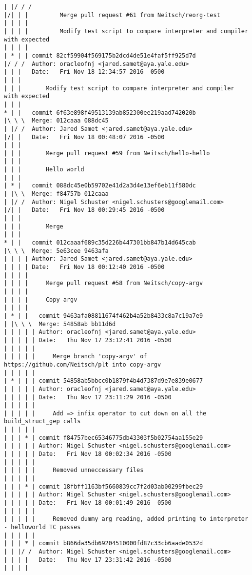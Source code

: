 \begin{lstlisting}
| |/ / /    
|/| | |         Merge pull request #61 from Neitsch/reorg-test
| | | |         
| | | |         Modify test script to compare interpreter and compiler with expected
| | | |     
| * | | commit 82cf59904f569175b2dcd4de51e4faf5ff925d7d
|/ / /  Author: oracleofnj <jared.samet@aya.yale.edu>
| | |   Date:   Fri Nov 18 12:34:57 2016 -0500
| | |   
| | |       Modify test script to compare interpreter and compiler with expected
| | |      
* | |   commit 6f63e898f49513139ab852300ee219aad742020b
|\ \ \  Merge: 012caaa 088dc45
| |/ /  Author: Jared Samet <jared.samet@aya.yale.edu>
|/| |   Date:   Fri Nov 18 00:48:07 2016 -0500
| | |   
| | |       Merge pull request #59 from Neitsch/hello-hello
| | |       
| | |       Hello world
| | |      
| * |   commit 088dc45e0b59702e41d2a3d4e13ef6eb11f580dc
| |\ \  Merge: f84757b 012caaa
| |/ /  Author: Nigel Schuster <nigel.schusters@googlemail.com>
|/| |   Date:   Fri Nov 18 00:29:45 2016 -0500
| | |   
| | |       Merge
| | |      
* | |   commit 012caaaf689c35d226b447301bb847b14d645cab
|\ \ \  Merge: 5e63cee 9463afa
| | | | Author: Jared Samet <jared.samet@aya.yale.edu>
| | | | Date:   Fri Nov 18 00:12:40 2016 -0500
| | | | 
| | | |     Merge pull request #58 from Neitsch/copy-argv
| | | |     
| | | |     Copy argv
| | | |       
| * | |   commit 9463afa08811674f462b4a52b8433c8a7c19a7e9
| |\ \ \  Merge: 54858ab bb11d6d
| | | | | Author: oracleofnj <jared.samet@aya.yale.edu>
| | | | | Date:   Thu Nov 17 23:12:41 2016 -0500
| | | | | 
| | | | |     Merge branch 'copy-argv' of https://github.com/Neitsch/plt into copy-argv
| | | | |      
| * | | | commit 54858ab5bbcc0b1879f4b4d7387d9e7e839e0677
| | | | | Author: oracleofnj <jared.samet@aya.yale.edu>
| | | | | Date:   Thu Nov 17 23:11:29 2016 -0500
| | | | | 
| | | | |     Add => infix operator to cut down on all the build_struct_gep calls
| | | | |      
| | | * | commit f84757bec65346775db43303f5b02754aa155e29
| | | | | Author: Nigel Schuster <nigel.schusters@googlemail.com>
| | | | | Date:   Fri Nov 18 00:02:34 2016 -0500
| | | | | 
| | | | |     Removed unneccessary files
| | | | |      
| | | * | commit 18fbff1163bf5660839cc7f2d03ab00299fbec29
| | | | | Author: Nigel Schuster <nigel.schusters@googlemail.com>
| | | | | Date:   Fri Nov 18 00:01:49 2016 -0500
| | | | | 
| | | | |     Removed dummy arg reading, added printing to interpreter - helloworld TC passes
| | | | |      
| | | * | commit b866da35db69204510000fd87c33cb6aade0532d
| | |/ /  Author: Nigel Schuster <nigel.schusters@googlemail.com>
| | | |   Date:   Thu Nov 17 23:31:42 2016 -0500
| | | |   

\end{lstlisting}
